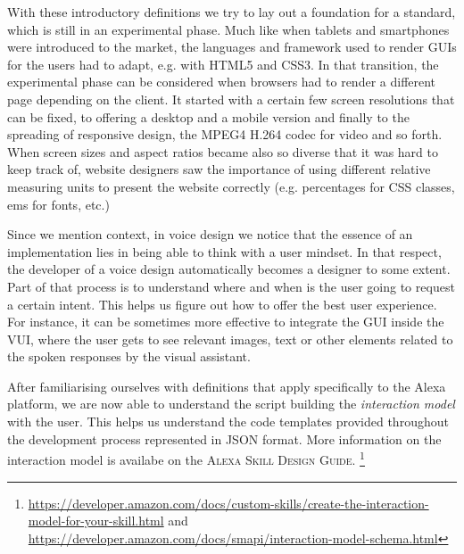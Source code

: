 With these introductory definitions we try to lay out a foundation for a standard, which is still in an experimental phase. Much like when tablets and smartphones were introduced to the market, the languages and framework used to render GUIs for the users had to adapt, e.g. with HTML5 and CSS3. In that transition, the experimental phase can be considered when browsers had to render a different page depending on the client. It started with a certain few screen resolutions that can be fixed, to offering a desktop and a mobile version and finally to the spreading of responsive design, the MPEG4 H.264 codec for video and so forth. When screen sizes and aspect ratios became also so diverse that it was hard to keep track of, website designers saw the importance of using different relative measuring units to present the website correctly (e.g. percentages for CSS classes, ems for fonts, etc.)


Since we mention context, in voice design we notice that the essence of an implementation lies in being able to think with a user mindset. In that respect, the developer of a voice design automatically becomes a designer to some extent. Part of that process is to understand where and when is the user going to request a certain intent. This helps us figure out how to offer the best user experience. For instance, it can be sometimes more effective to integrate the GUI inside the VUI, where the user gets to see relevant images, text or other elements related to the spoken responses by the visual assistant.\\



After familiarising ourselves with definitions %
that apply specifically to the Alexa platform,
we are now able to understand the script building the \textit{interaction model} with the user. %
This helps us understand the code templates provided throughout the development process %
represented in JSON format. 
More information on the interaction model is availabe on the \textsc{Alexa Skill Design Guide.} \footnote{ \url{https://developer.amazon.com/docs/custom-skills/create-the-interaction-model-for-your-skill.html} and\\
	\noindent
	\url{https://developer.amazon.com/docs/smapi/interaction-model-schema.html}}



